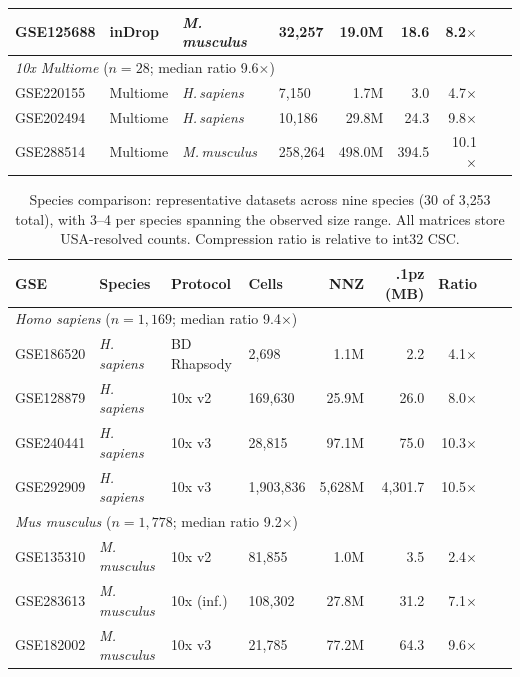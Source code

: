\documentclass[10pt,twocolumn,letterpaper]{article}
\begin{document}
\begin{table}[h]
\begin{tabular}{llllrrrrr}
GSE125688  & inDrop & \textit{M.\,musculus}    &   32{,}257 &   19.0M &   18.6 &  8.2$\times$ \\
\midrule
\multicolumn{7}{l}{\textit{10x Multiome} ($n = 28$; median ratio 9.6$\times$)} \\
GSE220155  & Multiome & \textit{H.\,sapiens}     &    7{,}150 &    1.7M &    3.0 &  4.7$\times$ \\
GSE202494  & Multiome & \textit{H.\,sapiens}     &   10{,}186 &   29.8M &   24.3 &  9.8$\times$ \\
GSE288514  & Multiome & \textit{M.\,musculus}    &  258{,}264 &  498.0M &  394.5 & 10.1$\times$ \\
\bottomrule
\end{tabular}
\end{table}

\begin{table}[h]
\centering
\caption{Species comparison: representative datasets across nine species (30 of 3{,}253 total), with 3--4 per species spanning the observed size range. All matrices store USA-resolved counts. Compression ratio is relative to int32 CSC.}
\label{tab:species}
\scriptsize
\begin{tabular}{llllrrrrr}
\toprule
GSE & Species & Protocol & Cells & NNZ & .1pz (MB) & Ratio \\
\midrule
\multicolumn{7}{l}{\textit{Homo sapiens} ($n = 1{,}169$; median ratio 9.4$\times$)} \\
GSE186520  & \textit{H.\,sapiens}  & BD Rhapsody &    2{,}698 &    1.1M &    2.2 &  4.1$\times$ \\
GSE128879  & \textit{H.\,sapiens}  & 10x v2      &  169{,}630 &   25.9M &   26.0 &  8.0$\times$ \\
GSE240441  & \textit{H.\,sapiens}  & 10x v3      &   28{,}815 &   97.1M &   75.0 & 10.3$\times$ \\
GSE292909  & \textit{H.\,sapiens}  & 10x v3      & 1{,}903{,}836 & 5{,}628M & 4{,}301.7 & 10.5$\times$ \\
\midrule
\multicolumn{7}{l}{\textit{Mus musculus} ($n = 1{,}778$; median ratio 9.2$\times$)} \\
GSE135310  & \textit{M.\,musculus} & 10x v2      &   81{,}855 &    1.0M &    3.5 &  2.4$\times$ \\
GSE283613  & \textit{M.\,musculus} & 10x (inf.)  &  108{,}302 &   27.8M &   31.2 &  7.1$\times$ \\
GSE182002  & \textit{M.\,musculus} & 10x v3      &   21{,}785 &   77.2M &   64.3 &  9.6$\times$ \\

\end{tabular}
\end{table}
\end{document}
